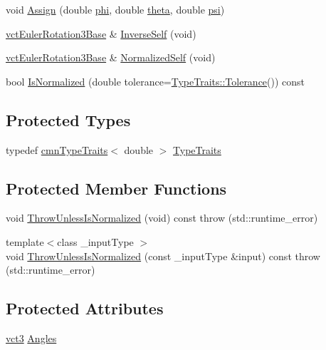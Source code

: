 \begin{DoxyCompactItemize}
void \hyperlink{classvct_euler_rotation3_base_a94233aef8bc9e0a56bd55e4e23009c62}{Assign} (double \hyperlink{classvct_euler_rotation3_base_af2e807e479e504cd47c58b308f25317c}{phi}, double \hyperlink{classvct_euler_rotation3_base_ac74e14d30f7d2077068e2f4b5c7219b1}{theta}, double \hyperlink{classvct_euler_rotation3_base_aeee06e33924728dd210644a390f86522}{psi})
\item 
\hyperlink{classvct_euler_rotation3_base}{vct\+Euler\+Rotation3\+Base} \& \hyperlink{classvct_euler_rotation3_base_a1a3771e279d6d79e51685695f266a9b4}{Inverse\+Self} (void)
\item 
\hyperlink{classvct_euler_rotation3_base}{vct\+Euler\+Rotation3\+Base} \& \hyperlink{classvct_euler_rotation3_base_af30b80b49e77f880948f236c58b45387}{Normalized\+Self} (void)
\item 
bool \hyperlink{classvct_euler_rotation3_base_a45a2bd9c871bcd6414b0a0ef84bae4bd}{Is\+Normalized} (double tolerance=\hyperlink{classcmn_type_traits_adc129bf9867295b90d300768b780fa99}{Type\+Traits\+::\+Tolerance}()) const 
\end{DoxyCompactItemize}
\subsection*{Protected Types}
\begin{DoxyCompactItemize}
\item 
typedef \hyperlink{classcmn_type_traits}{cmn\+Type\+Traits}$<$ double $>$ \hyperlink{classvct_euler_rotation3_base_afa97e7870204c6ff1872a0e46e45de39}{Type\+Traits}
\end{DoxyCompactItemize}
\subsection*{Protected Member Functions}
\begin{DoxyCompactItemize}
\item 
void \hyperlink{classvct_euler_rotation3_base_a593489f9bbc621319fd7d7fd3cdc3b97}{Throw\+Unless\+Is\+Normalized} (void) const   throw (std\+::runtime\+\_\+error)
\item 
{\footnotesize template$<$class \+\_\+input\+Type $>$ }\\void \hyperlink{classvct_euler_rotation3_base_ad0b0fa34d868d1031e444a2e35aa928e}{Throw\+Unless\+Is\+Normalized} (const \+\_\+input\+Type \&input) const   throw (std\+::runtime\+\_\+error)
\end{DoxyCompactItemize}
\subsection*{Protected Attributes}
\begin{DoxyCompactItemize}
\item 
\hyperlink{vct_fixed_size_vector_types_8h_a3af82acdbf4eeb73c551909240b106ea}{vct3} \hyperlink{classvct_euler_rotation3_base_a203faf33e57587d98e65a216d186288c}{Angles}
\end{DoxyCompactItemize}


